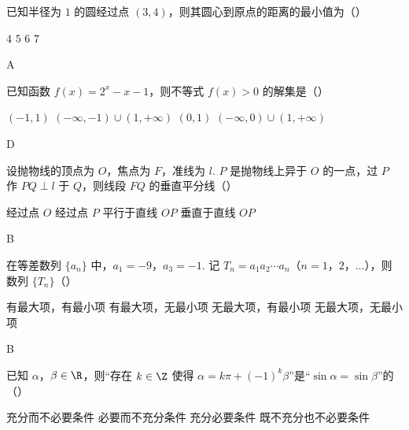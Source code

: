 \begin{problem}
已知半径为 \(1\) 的圆经过点 \((3,4)\)，则其圆心到原点的距离的最小值为（\quad）

\choices
    {\(4\)}
    {\(5\)}
    {\(6\)}
    {\(7\)}
\end{problem}

\begin{answer}
A
\end{answer}

\begin{problem}
已知函数 \(f(x)=2^x-x-1\)，则不等式 \(f(x)>0\) 的解集是（\quad）

\choices
    {\((-1,1)\)}
    {\((-\infty,-1)\cup(1,+\infty)\)}
    {\((0,1)\)}
    {\((-\infty,0)\cup(1,+\infty)\)}
\end{problem}

\begin{answer}
D
\end{answer}

\begin{problem}
设抛物线的顶点为 \(O\)，焦点为 \(F\)，准线为 \(l\). \(P\) 是抛物线上异于 \(O\) 的一点，过 \(P\) 作 \(PQ\perp l\) 于 \(Q\)，则线段 \(FQ\) 的垂直平分线（\quad）

\choices
    {经过点 \(O\)}
    {经过点 \(P\)}
    {平行于直线 \(OP\)}
    {垂直于直线 \(OP\)}
\end{problem}

\begin{answer}
B
\end{answer}

\begin{problem}
在等差数列 \(\{a_n\}\) 中，\(a_1=-9\)，\(a_3=-1\). 记 \(T_n=a_1a_2\cdots a_n\)（\(n=1\)，\(2\)，\(\dots\)），则数列 \(\{T_n\}\)（\quad）

\choices
    {有最大项，有最小项}
    {有最大项，无最小项}
    {无最大项，有最小项}
    {无最大项，无最小项}
\end{problem}

\begin{answer}
B
\end{answer}

\begin{problem}
已知 \(\alpha\)，\(\beta\in\R\)，则“存在 \(k\in\Z\) 使得 \(\alpha=k\pi+(-1)^k\beta\)”是“\(\sin\alpha=\sin\beta\)”的（\quad）

\choices
    {充分而不必要条件}
    {必要而不充分条件}
    {充分必要条件}
    {既不充分也不必要条件}
\end{problem}

